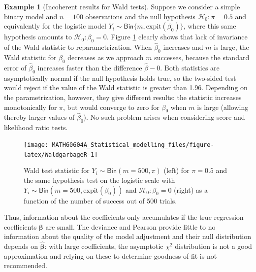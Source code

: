 \documentclass[
  11pt,
  letterpaper,
]{book}
\theoremstyle{definition}
\theoremstyle{definition}
\newtheorem{example}{Example}[chapter]
\theoremstyle{definition}
\theoremstyle{remark}
\begin{document}
\begin{example}[Incoherent results for Wald tests]
\protect\hypertarget{exm:waldgarbage}{}{\label{exm:waldgarbage} {} }Suppose we consider a simple binary model and \(n=100\) observations and the null hypothesis \(\mathscr{H}_0:\pi = 0.5\) and equivalently for the logistic model \(Y_i \sim \mathsf{Bin}\{m, \mathrm{expit}(\beta_0)\}\), where this same hypothesis amounts to \(\mathscr{H}_0:\beta_0=0\). Figure \ref{fig:WaldgarbageR} clearly shows that lack of invariance of the Wald statistic to reparametrization. When \(\widehat{\beta}_0\) increases and \(m\) is large, the Wald statistic for \(\beta_0\) decreases as we approach \(m\) successes, because the standard error of \(\widehat{\beta}_0\) increases faster than the difference \(\widehat{\beta}-0\). Both statistics are asymptotically normal if the null hypothesis holds true, so the two-sided test would reject if the value of the Wald statistic is greater than 1.96. Depending on the parametrization, however, they give different results: the statistic increases monotonically for \(\pi\), but would converge to zero for \(\beta_0\) when \(m\) is large (allowing thereby larger values of \(\widehat{\beta}_0\)). No such problem arises when considering score and likelihood ratio tests.
\end{example}

\begin{figure}

{\centering \texttt{[image: MATH60604A\_Statistical\_modelling\_files/figure-latex/WaldgarbageR-1]} 

}

\caption{Wald test statistic for $Y_i \sim \mathsf{Bin}(m=500, \pi)$ (left)  for $\pi=0.5$ and the same hypothesis test on the logistic scale with $Y_i \sim \mathsf{Bin}(m=500, \mathrm{expit}(\beta_0))$ and $\mathscr{H}_0:\beta_0=0$ (right) as a function of the number of success out of 500 trials.}\label{fig:WaldgarbageR}
\end{figure}

Thus, information about the coefficients only accumulates if the true
regression coefficients \(\boldsymbol{\beta}\) are small. The deviance and
Pearson provide little to no information about the quality of the model
adjustment and their null distribution depends on
\(\widehat{\boldsymbol{\beta}}\): with large coefficients, the asymptotic
\(\chi^2\) distribution is not a good approximation and relying on these
to determine goodness-of-fit is not recommended.
\end{document}
